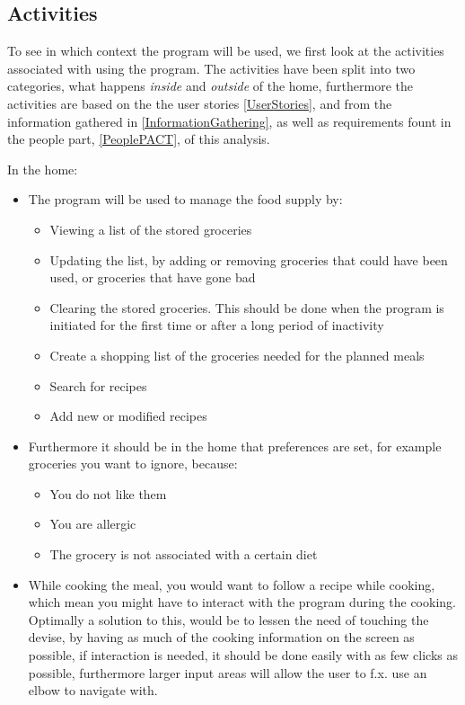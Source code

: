 \subsection{Activities}
To see in which context the program will be used, we first look at the activities associated with using the program. The activities have been split into two categories, what happens \textit{inside} and \textit{outside} of the home, furthermore the activities are based on the the user stories  \cref{UserStories}, and from the information gathered in \cref{InformationGathering}, as well as requirements fount in the people part, \cref{PeoplePACT}, of this analysis.

In the home:
\begin{itemize}
\item The program will be used to manage the food supply by:
	\begin{itemize}
		\item Viewing a list of the stored groceries
		\item Updating the list, by adding or removing groceries that could have been used, or groceries that have gone bad
		\item Clearing the stored groceries. This should be done when the program is initiated for the first time or after a long period of inactivity
		\item Create a shopping list of the groceries needed for the planned meals
		\item Search for recipes
		\item Add new or modified recipes
	\end{itemize}
	\item Furthermore it should be in the home that preferences are set, for example groceries you want to ignore, because:
	\begin{itemize}
		\item You do not like them
		\item You are allergic
		\item The grocery is not associated with a certain diet
	\end{itemize}
	\item While cooking the meal, you would want to follow a recipe while cooking, which mean you might have to interact with the program during the cooking. Optimally a solution to this, would be to lessen the need of touching the devise, by having as much of the cooking information on the screen as possible, if interaction is needed, it should be done easily with as few clicks as possible, furthermore larger input areas will allow the user to f.x. use an elbow to navigate with.
\end{itemize}

